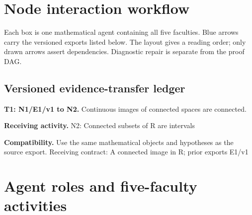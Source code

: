 \documentclass[preprint,12pt,aps,pra,showkeys,amsmath,amssymb,superscriptaddress,floatfix]{revtex4-2}
\theoremstyle{definition}
\theoremstyle{remark}
\newcommand{\field}[2]{\par\smallskip\noindent\textbf{#1.} #2\par}
\begin{document}
\clearpage\section{Node interaction workflow}

\begin{center}\end{center}

Each box is one mathematical agent containing all five faculties. Blue
arrows carry the versioned exports listed below. The layout gives a
reading order; only drawn arrows assert dependencies. Diagnostic repair
is separate from the proof DAG.

\subsection{Versioned evidence-transfer ledger}

\begingroup\small\linespread{1.05}\selectfont

\field{T1: N1/E1/v1 to N2}{Continuous images of connected spaces are connected.}

\field{Receiving activity}{N2: Connected subsets of R are intervals}

\field{Compatibility}{Use the same mathematical objects and hypotheses as the source export.
Receiving contract: A connected image in R; prior exports E1/v1}

\endgroup

\clearpage\section{Agent roles and five-faculty activities}\begingroup\small\linespread{1.05}\selectfont{}
\end{document}
